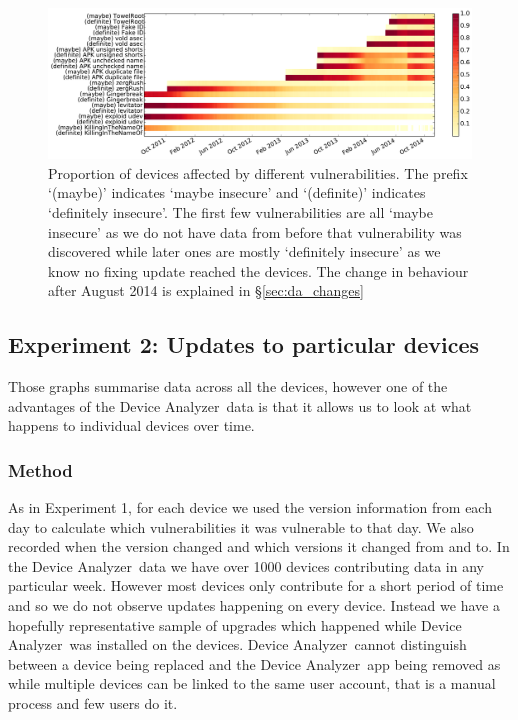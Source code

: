 \documentclass[conference,a4paper,twoside]{IEEEtran}
\newcommand{\da}{Device Analyzer}
\begin{document}
\begin{figure}
 \includegraphics[width=\textwidth]{figures/nvulnerabilities_heat.pdf}
 \caption{Proportion of devices affected by different vulnerabilities. The prefix `(maybe)' indicates `maybe insecure' and `(definite)' indicates `definitely insecure'. The first few vulnerabilities are all `maybe insecure' as we do not have data from before that vulnerability was discovered while later ones are mostly `definitely insecure' as we know no fixing update reached the devices. The change in behaviour after August 2014 is explained in \S\ref{sec:da_changes}}
 \label{fig:nvulnerabilities_heat}
\end{figure}


\subsection{Experiment 2: Updates to particular devices}\label{sec:exp:device_updates}
Those graphs summarise data across all the devices, however one of the advantages of the \da\ data is that it allows us to look at what happens to individual devices over time.

\subsubsection{Method}
As in Experiment 1, for each device we used the version information from each day to calculate which vulnerabilities it was vulnerable to that day.
We also recorded when the version changed and which versions it changed from and to.
In the \da\ data we have over 1000 devices contributing data in any particular week.
However most devices only contribute for a short period of time and so we do not observe updates happening on every device.
Instead we have a hopefully representative sample of upgrades which happened while \da\ was installed on the devices.
\da\ cannot distinguish between a device being replaced and the \da\ app being removed as while multiple devices can be linked to the same user account, that is a manual process and few users do it.
\end{document}
